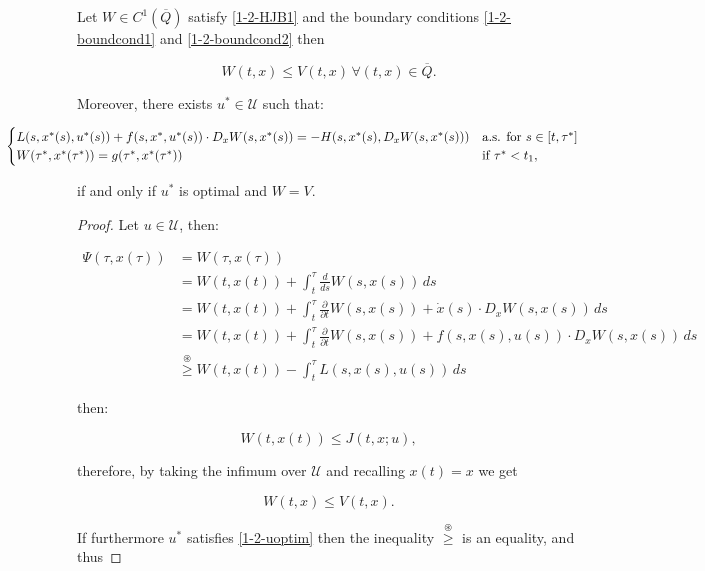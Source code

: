 \begin{theorem}\label{1-2-Verificationthe}
    Let $W\in C^1(\overline{Q})$ satisfy \eqref{1-2-HJB1} and the boundary conditions \eqref{1-2-boundcond1} and \eqref{1-2-boundcond2} then

    \[W(t,x)\leq V(t,x) \, \forall (t,x)\in\overline{Q}.\]

    Moreover, there exists $u^{\ast}\in\mathcal{U}$ such that:

    \begin{equation}\label{1-2-uoptim}
        \hspace{-20mm}\begin{cases}
            L(s,x^{\ast}(s),u^{\ast}(s)) + f(s,x^{\ast},u^{\ast}(s))\cdot D_xW(s,x^{\ast}(s)) = - H(s,x^{\ast}(s),D_xW(s,x^{\ast}(s))) & \text{a.s. for } s\in[t,\tau^{\ast}] \\
            W(\tau^{\ast},x^{\ast}(\tau^{\ast})) = g(\tau^{\ast},x^{\ast}(\tau^{\ast})) & \text{if } \tau^{\ast}<t_1,
        \end{cases}    
    \end{equation}

    if and only if $u^{\ast}$ is optimal and $W=V$.

    \begin{proof}
        Let $u\in\mathcal{U}$, then:

        \begin{align*}
            \Psi(\tau,x(\tau)) & = W(\tau,x(\tau)) \\
            & = W(t,x(t)) + \int_t^{\tau}\frac{d}{ds}W(s,x(s)) \,ds \\
            & = W(t,x(t)) + \int_t^{\tau} \frac{\partial}{\partial t}W(s,x(s)) + \dot{x}(s)\cdot D_xW(s,x(s)) \,ds \\
            & = W(t,x(t)) + \int_t^{\tau} \frac{\partial}{\partial t}W(s,x(s)) + f(s,x(s),u(s))\cdot D_xW(s,x(s)) \,ds \\
            & \overset{\circledast}{\geq} W(t,x(t)) - \int_t^{\tau} L(s,x(s),u(s)) \,ds  
        \end{align*}

        then:

        \[W(t,x(t)) \leq J(t,x;u),\]

        therefore, by taking the infimum over $\mathcal{U}$ and recalling $x(t)=x$ we get

        \[W(t,x) \leq V(t,x).\]

        If furthermore $u^{\ast}$ satisfies \eqref{1-2-uoptim} then the inequality $\overset{\circledast}{\geq}$ is an equality, and thus


\end{proof}
\end{theorem}

